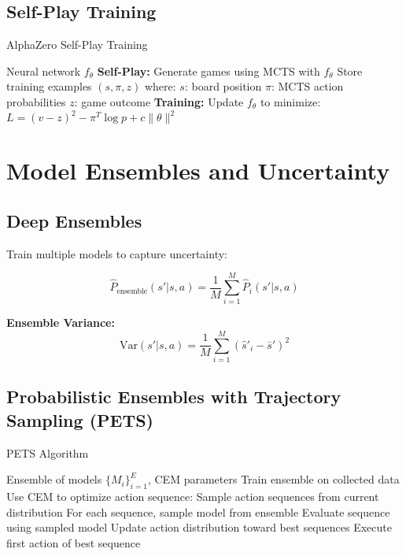 \subsection{Self-Play Training}

\begin{algorithm}
\caption{AlphaZero Self-Play Training}
\begin{algorithmic}
\REQUIRE Neural network $f_\theta$
    \STATE \textbf{Self-Play:} Generate games using MCTS with $f_\theta$
    \STATE Store training examples $(s, \pi, z)$ where:
    \STATE \quad $s$: board position
    \STATE \quad $\pi$: MCTS action probabilities  
    \STATE \quad $z$: game outcome
    \STATE \textbf{Training:} Update $f_\theta$ to minimize:
    \STATE \quad $L = (v - z)^2 - \pi^T \log p + c \|\theta\|^2$
\ENDFOR
\end{algorithmic}
\end{algorithm}

\section{Model Ensembles and Uncertainty}

\subsection{Deep Ensembles}

Train multiple models to capture uncertainty:

\begin{equation}
\hat{P}_{\text{ensemble}}(s'|s,a) = \frac{1}{M} \sum_{i=1}^M \hat{P}_i(s'|s,a)
\end{equation}

\textbf{Ensemble Variance:}
\begin{equation}
\text{Var}(s'|s,a) = \frac{1}{M} \sum_{i=1}^M (\hat{s}'_i - \bar{s}')^2
\end{equation}

\subsection{Probabilistic Ensembles with Trajectory Sampling (PETS)}

\begin{algorithm}
\caption{PETS Algorithm}
\begin{algorithmic}
\REQUIRE Ensemble of models $\{M_i\}_{i=1}^E$, CEM parameters
    \STATE Train ensemble on collected data
    \STATE Use CEM to optimize action sequence:
        \STATE Sample action sequences from current distribution
        \STATE For each sequence, sample model from ensemble
        \STATE Evaluate sequence using sampled model
        \STATE Update action distribution toward best sequences
    \ENDFOR
    \STATE Execute first action of best sequence
\ENDFOR
\end{algorithmic}
\end{algorithm}

